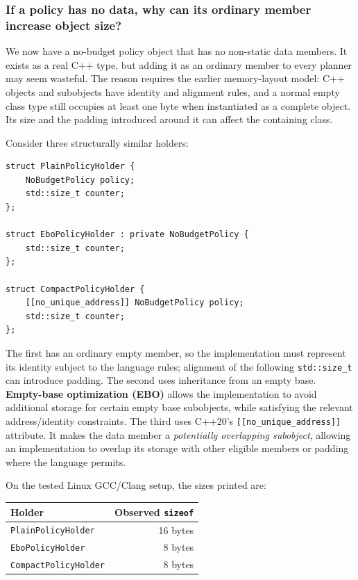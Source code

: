 \subsubsection{If a policy has no data, why can its ordinary member increase object size?}\label{if-a-policy-has-no-data-why-can-its-ordinary-member-increase-object-size}

We now have a no-budget policy object that has no non-static data members. It exists as a real C++ type, but adding it as an ordinary member to every planner may seem wasteful. The reason requires the earlier memory-layout model: C++ objects and subobjects have identity and alignment rules, and a normal empty class type still occupies at least one byte when instantiated as a complete object. Its size and the padding introduced around it can affect the containing class.

Consider three structurally similar holders:

\begin{verbatim}
struct PlainPolicyHolder {
    NoBudgetPolicy policy;
    std::size_t counter;
};

struct EboPolicyHolder : private NoBudgetPolicy {
    std::size_t counter;
};

struct CompactPolicyHolder {
    [[no_unique_address]] NoBudgetPolicy policy;
    std::size_t counter;
};
\end{verbatim}

The first has an ordinary empty member, so the implementation must represent its identity subject to the language rules; alignment of the following \texttt{std::size\_t} can introduce padding. The second uses inheritance from an empty base. \textbf{Empty-base optimization (EBO)} allows the implementation to avoid additional storage for certain empty base subobjects, while satisfying the relevant address/identity constraints. The third uses C++20's \texttt{{[}{[}no\_unique\_address{]}{]}} attribute. It makes the data member a \emph{potentially overlapping subobject}, allowing an implementation to overlap its storage with other eligible members or padding where the language permits.

On the tested Linux GCC/Clang setup, the sizes printed are:

{\def\LTcaptype{none} %
\begin{longtable}[]{@{}lr@{}}
\toprule\noalign{}
Holder & Observed \texttt{sizeof} \\
\midrule\noalign{}
\endhead
\bottomrule\noalign{}
\endlastfoot
\texttt{PlainPolicyHolder} & 16 bytes \\
\texttt{EboPolicyHolder} & 8 bytes \\
\texttt{CompactPolicyHolder} & 8 bytes \\
\end{longtable}
}

